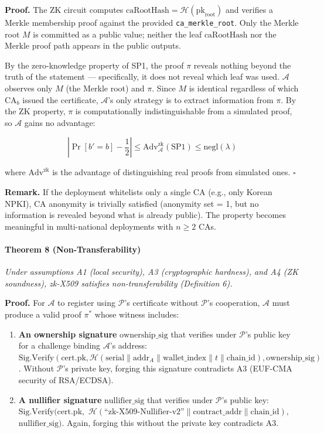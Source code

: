 \documentclass[11pt, a4paper]{article}
\begin{document}
\textbf{Proof.} The ZK circuit computes
\(\text{caRootHash} = \mathcal{H}(\text{pk}_{\text{root}})\) and
verifies a Merkle membership proof against the provided
\texttt{ca\_merkle\_root}. Only the Merkle root \(M\) is committed as a
public value; neither the leaf \(\text{caRootHash}\) nor the Merkle
proof path appears in the public outputs.

By the zero-knowledge property of SP1, the proof \(\pi\) reveals nothing
beyond the truth of the statement --- specifically, it does not reveal
which leaf was used. \(\mathcal{A}\) observes only \(M\) (the Merkle
root) and \(\pi\). Since \(M\) is identical regardless of which
\(\text{CA}_b\) issued the certificate, \(\mathcal{A}\)'s only strategy
is to extract information from \(\pi\). By the ZK property, \(\pi\) is
computationally indistinguishable from a simulated proof, so
\(\mathcal{A}\) gains no advantage:

\[\left| \Pr[b' = b] - \frac{1}{2} \right| \leq \text{Adv}_{\mathcal{A}}^{\text{zk}}(\text{SP1}) \leq \text{negl}(\lambda)\]

where \(\text{Adv}^{\text{zk}}\) is the advantage of distinguishing real
proofs from simulated ones. \(\square\)

\textbf{Remark.} If the deployment whitelists only a single CA (e.g.,
only Korean NPKI), CA anonymity is trivially satisfied (anonymity set =
1, but no information is revealed beyond what is already public). The
property becomes meaningful in multi-national deployments with
\(n \geq 2\) CAs.

\paragraph{Theorem 8
(Non-Transferability)}\label{theorem-8-non-transferability}

\emph{Under assumptions A1 (local security), A3 (cryptographic
hardness), and A4 (ZK soundness), zk-X509 satisfies non-transferability
(Definition 6).}

\textbf{Proof.} For \(\mathcal{A}\) to register using \(\mathcal{P}\)'s
certificate without \(\mathcal{P}\)'s cooperation, \(\mathcal{A}\) must
produce a valid proof \(\pi^*\) whose witness includes:

\begin{enumerate}
\def\labelenumi{(\alph{enumi})}
\item
  \textbf{An ownership signature} \(\text{ownership\_sig}\) that
  verifies under \(\mathcal{P}\)'s public key for a challenge binding
  \(\mathcal{A}\)'s address:
  \(\text{Sig.Verify}(\text{cert.pk}, \mathcal{H}(\text{serial} \| \text{addr}_A \| \text{wallet\_index} \| t \| \text{chain\_id}), \text{ownership\_sig})\).
  Without \(\mathcal{P}\)'s private key, forging this signature
  contradicts A3 (EUF-CMA security of RSA/ECDSA).
\item
  \textbf{A nullifier signature} \(\text{nullifier\_sig}\) that verifies
  under \(\mathcal{P}\)'s public key:
  \(\text{Sig.Verify}(\text{cert.pk},\)
  \(\mathcal{H}(\text{``zk-X509-Nullifier-v2''} \| \text{contract\_addr} \| \text{chain\_id}),\)
  \(\text{nullifier\_sig})\).
  Again, forging this without the private key contradicts A3.
\end{enumerate}
\end{document}
